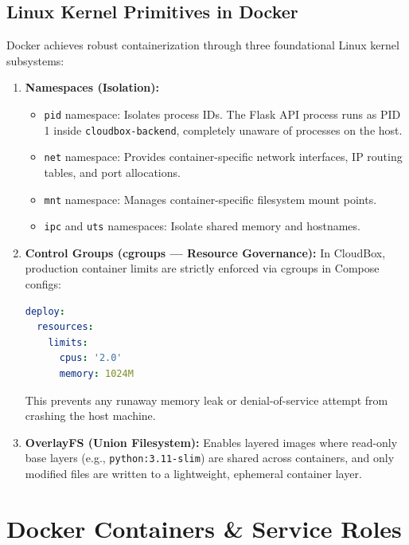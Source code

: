 \documentclass[11pt,a4paper]{report}
\begin{document}
\section{Linux Kernel Primitives in Docker}
Docker achieves robust containerization through three foundational Linux kernel subsystems:
\begin{enumerate}[itemsep=1pt,topsep=1pt]
    \item \textbf{Namespaces (Isolation):}
    \begin{itemize}[itemsep=1pt]
        \item \texttt{pid} namespace: Isolates process IDs. The Flask API process runs as PID 1 inside \texttt{cloudbox-backend}, completely unaware of processes on the host.
        \item \texttt{net} namespace: Provides container-specific network interfaces, IP routing tables, and port allocations.
        \item \texttt{mnt} namespace: Manages container-specific filesystem mount points.
        \item \texttt{ipc} and \texttt{uts} namespaces: Isolate shared memory and hostnames.
    \end{itemize}
    \item \textbf{Control Groups (cgroups --- Resource Governance):}
    In CloudBox, production container limits are strictly enforced via cgroups in Compose configs:
\begin{lstlisting}[language=yaml]
deploy:
  resources:
    limits:
      cpus: '2.0'
      memory: 1024M
\end{lstlisting}
    This prevents any runaway memory leak or denial-of-service attempt from crashing the host machine.
    \item \textbf{OverlayFS (Union Filesystem):}
    Enables layered images where read-only base layers (e.g., \texttt{python:3.11-slim}) are shared across containers, and only modified files are written to a lightweight, ephemeral container layer.
\end{enumerate}

\clearpage

\chapter{Docker Containers \& Service Roles}
\end{document}
